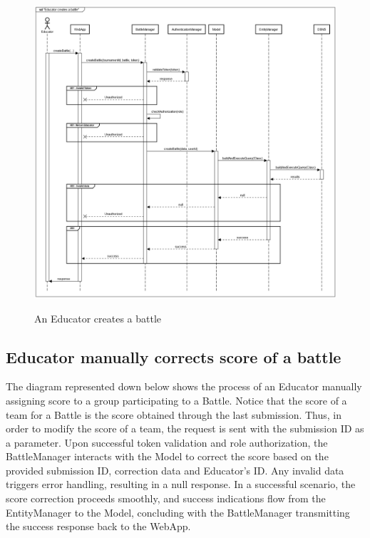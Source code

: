 \documentclass{Configuration_Files/Template}
\begin{document}
\begin{figure}[H]
\centering
\includegraphics[scale = 0.33]{Images/diagrams/sequences/createBattle.png}\\
\caption{An Educator creates a battle}
\end{figure}

\subsection*{Educator manually corrects score of a battle}

The diagram represented down below shows the process of an Educator manually assigning score to a group participating to a Battle. Notice that the score of a team for a Battle is the score obtained through the last submission. Thus, in order to modify the score of a team, the request is sent with the submission ID as a parameter. Upon successful token validation and role authorization, the BattleManager interacts with the Model to correct the score based on the provided submission ID, correction data and Educator's ID. Any invalid data triggers error handling, resulting in a null response. In a successful scenario, the score correction proceeds smoothly, and success indications flow from the EntityManager to the Model, concluding with the BattleManager transmitting the success response back to the WebApp.
\end{document}
